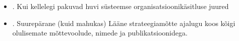 \documentclass[nobib]{tufte-handout}
\begin{document}
\begin{itemize}
\begin{itemize}
		\item \cite{optner}. Kui kellelegi pakuvad huvi süsteemse organisatsioonikäsitluse juured
		\item \cite{freedman2013strategy}. Suurepärane (kuid mahukas) Lääne strateegiamõtte ajalugu koos kõigi olulisemate mõttevoolude, nimede ja publikatsioonidega. 
	\end{itemize}
\end{itemize}



\end{document}
